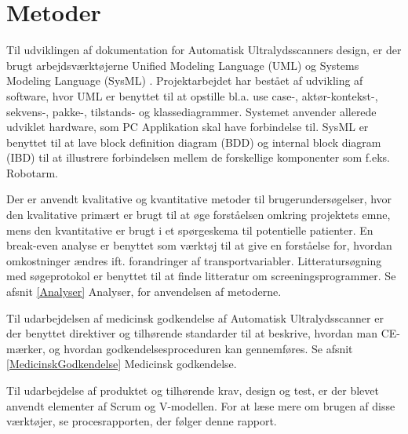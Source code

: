 \chapter{Metoder}\label{Metoder}

Til udviklingen af dokumentation for Automatisk Ultralydsscanners design, er der brugt arbejdsværktøjerne Unified Modeling Language (UML) \cite{UML}  og Systems Modeling Language (SysML) \cite{SysML}. Projektarbejdet har bestået af udvikling af software, hvor UML er benyttet til at opstille bl.a. use case-, aktør-kontekst-, sekvens-, pakke-, tilstands- og klassediagrammer. Systemet anvender allerede udviklet hardware, som PC Applikation skal have forbindelse til. SysML er benyttet til at lave block definition diagram (BDD) og internal block diagram (IBD) til at illustrere forbindelsen mellem de forskellige komponenter som f.eks. Robotarm.

Der er anvendt kvalitative og kvantitative metoder \cite{MetoderBruger} til brugerundersøgelser, hvor den kvalitative primært er brugt til at øge forståelsen omkring projektets emne, mens den kvantitative er brugt i et spørgeskema til potentielle patienter. En break-even analyse \cite{Erhvervsokonomi} er benyttet som værktøj til at give en forståelse for, hvordan omkostninger ændres ift. forandringer af transportvariabler. Litteratursøgning med søgeprotokol er benyttet til at finde litteratur om screeningsprogrammer. Se afsnit \ref{Analyser} Analyser, for anvendelsen af metoderne. 

Til udarbejdelsen af medicinsk godkendelse af Automatisk Ultralydsscanner er der benyttet direktiver og tilhørende standarder til at beskrive, hvordan man CE-mærker, og hvordan godkendelsesproceduren kan gennemføres.  Se afsnit \ref{MedicinskGodkendelse} Medicinsk godkendelse.

Til udarbejdelse af produktet og tilhørende krav, design og test, er der blevet anvendt elementer af Scrum og V-modellen. For at læse mere om brugen af disse værktøjer, se procesrapporten, der følger denne rapport.

